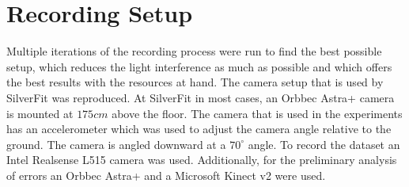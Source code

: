 \section{Recording Setup}

Multiple iterations of the recording process were run to find the best possible setup, which reduces the light interference as much as possible and which offers the best results with the resources at hand. The camera setup that is used by SilverFit was reproduced. At SilverFit in most cases, an Orbbec Astra+ camera is mounted at $175cm$ above the floor. The camera that is used in the experiments has an accelerometer which was used to adjust the camera angle relative to the ground. The camera is angled downward at a $70^\circ$ angle. To record the dataset an Intel Realsense L515 camera was used. Additionally, for the preliminary analysis of errors an Orbbec Astra+ and a Microsoft Kinect v2 were used.
